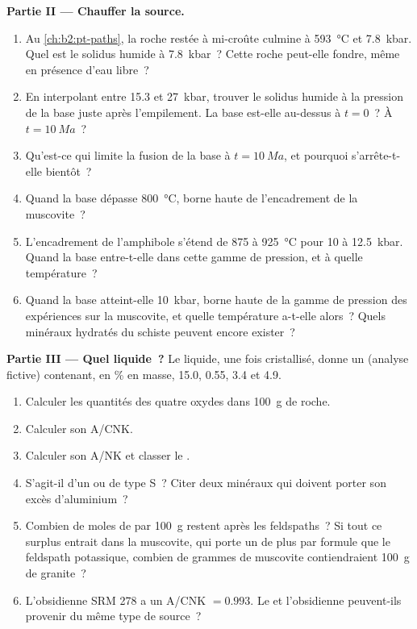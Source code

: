 \begin{problem}
\noindent\textbf{Partie II --- Chauffer la source.}
\begin{enumerate}[resume]
\item Au \cref{ch:b2:pt-paths}, la roche restée à mi-croûte culmine à \qty{593}{\celsius}
et \qty{7.8}{kbar}. Quel est le solidus humide à \qty{7.8}{kbar}~? Cette roche peut-elle fondre, même
en présence d'eau libre~?
\item En interpolant entre 15.3 et \qty{27}{kbar}, trouver le solidus humide à la pression
de la base juste après l'empilement. La base est-elle au-dessus à $t = 0$~? À $t = \qty{10}{Ma}$~?
\item Qu'est-ce qui limite la fusion de la base à $t = \qty{10}{Ma}$, et pourquoi s'arrête-t-elle
bientôt~?
\item Quand la base dépasse \qty{800}{\celsius}, borne haute de l'encadrement de la
muscovite~?
\item L'encadrement de l'amphibole s'étend de 875 à \qty{925}{\celsius} pour 10 à \qty{12.5}{kbar}.
Quand la base entre-t-elle dans cette gamme de pression, et à quelle température~?
\item Quand la base atteint-elle \qty{10}{kbar}, borne haute de la gamme de pression des
expériences sur la muscovite, et quelle température a-t-elle alors~? Quels minéraux hydratés du schiste peuvent
encore exister~?
\end{enumerate}

\noindent\textbf{Partie III --- Quel liquide~?}
Le liquide, une fois cristallisé, donne un  (analyse fictive) contenant, en
\unit{\percent} en masse,  15.0,  0.55,  3.4 et  4.9.
\begin{enumerate}[resume]
\item Calculer les quantités des quatre oxydes dans \qty{100}{\gram} de roche.
\item Calculer son A/CNK.
\item Calculer son A/NK et classer le .
\item S'agit-il d'un  ou de type S~? Citer deux minéraux qui doivent porter son excès
d'aluminium~?
\item Combien de moles de  par \qty{100}{\gram} restent après les
feldspaths~? Si tout ce surplus entrait dans la muscovite, qui porte un  de plus par
formule que le feldspath potassique, combien de grammes de muscovite
contiendraient \qty{100}{\gram} de granite~?
\item L'obsidienne SRM 278 a un A/CNK $= 0.993$. Le  et l'obsidienne peuvent-ils
provenir du même type de source~?
\end{enumerate}


\end{problem}
